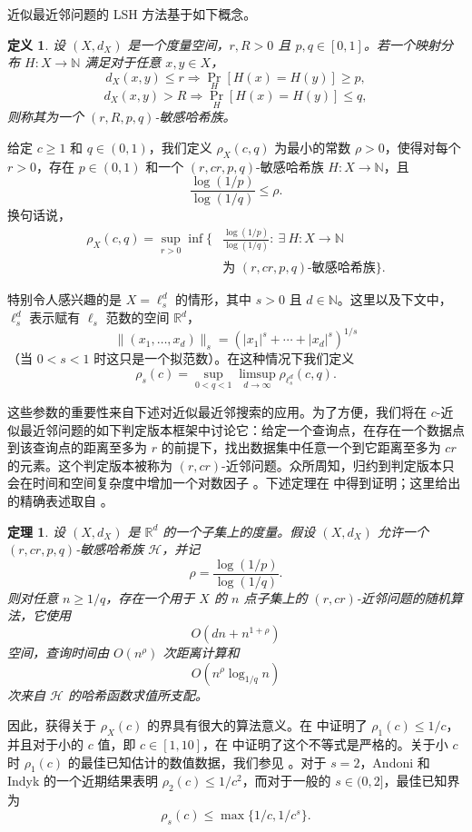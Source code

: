 \documentclass[10pt,twocolumn]{ctexart}
\newtheorem{definition}{定义}
\newtheorem{theorem}{定理}
\begin{document}
近似最近邻问题的 LSH 方法基于如下概念。

\begin{definition}
设 $(X,d_X)$ 是一个度量空间，$r,R>0$ 且 $p,q\in[0,1]$。若一个映射分布 $H:X\to\mathbb{N}$ 满足对于任意 $x,y\in X$，
\[
d_X(x,y)\le r \Rightarrow \Pr_H[H(x)=H(y)]\ge p,
\]
\[
d_X(x,y)>R \Rightarrow \Pr_H[H(x)=H(y)]\le q,
\]
则称其为一个 $(r,R,p,q)$-敏感哈希族。
\end{definition}

给定 $c\ge 1$ 和 $q\in(0,1)$，我们定义 $\rho_X(c,q)$ 为最小的常数 $\rho>0$，使得对每个 $r>0$，存在 $p\in(0,1)$ 和一个 $(r,cr,p,q)$-敏感哈希族 $H:X\to\mathbb{N}$，且
\[
\frac{\log(1/p)}{\log(1/q)}\le \rho.
\]
换句话说，
\begin{equation}
\begin{aligned}
\rho_X(c,q)=\sup_{r>0}\inf\{&
\frac{\log(1/p)}{\log(1/q)}:\ \exists\ H:X\to\mathbb{N}\\
&\text{为 }(r,cr,p,q)\text{-敏感哈希族}\}.
\end{aligned}
\end{equation}

特别令人感兴趣的是 $X=\ell_s^d$ 的情形，其中 $s>0$ 且 $d\in\mathbb{N}$。这里以及下文中，$\ell_s^d$ 表示赋有 $\ell_s$ 范数的空间 $\mathbb{R}^d$，
\[
\|(x_1,\ldots,x_d)\|_s=(|x_1|^s+\cdots+|x_d|^s)^{1/s}
\]
（当 $0<s<1$ 时这只是一个拟范数）。在这种情况下我们定义
\[
\rho_s(c)=\sup_{0<q<1}\limsup_{d\to\infty}\rho_{\ell_s^d}(c,q).
\]

这些参数的重要性来自下述对近似最近邻搜索的应用。为了方便，我们将在 $c$-近似最近邻问题的如下判定版本框架中讨论它：给定一个查询点，在存在一个数据点到该查询点的距离至多为 $r$ 的前提下，找出数据集中任意一个到它距离至多为 $cr$ 的元素。这个判定版本被称为 $(r,cr)$-近邻问题。众所周知，归约到判定版本只会在时间和空间复杂度中增加一个对数因子 \cite{IM98,HP01}。下述定理在 \cite{IM98} 中得到证明；这里给出的精确表述取自 \cite{DIM04}。

\begin{theorem}
设 $(X,d_X)$ 是 $\mathbb{R}^d$ 的一个子集上的度量。假设 $(X,d_X)$ 允许一个 $(r,cr,p,q)$-敏感哈希族 $\mathcal{H}$，并记
\[
\rho=\frac{\log(1/p)}{\log(1/q)}.
\]
则对任意 $n\ge 1/q$，存在一个用于 $X$ 的 $n$ 点子集上的 $(r,cr)$-近邻问题的随机算法，它使用
\[
O(dn+n^{1+\rho})
\]
空间，查询时间由 $O(n^\rho)$ 次距离计算和
\[
O\!\left(n^\rho\log_{1/q}n\right)
\]
次来自 $\mathcal{H}$ 的哈希函数求值所支配。
\end{theorem}

因此，获得关于 $\rho_X(c)$ 的界具有很大的算法意义。在 \cite{IM98} 中证明了 $\rho_1(c)\le 1/c$，并且对于小的 $c$ 值，即 $c\in[1,10]$，在 \cite{DIM04} 中证明了这个不等式是严格的。关于小 $c$ 时 $\rho_1(c)$ 的最佳已知估计的数值数据，我们参见 \cite{DIM04}。对于 $s=2$，Andoni 和 Indyk \cite{AI05} 的一个近期结果表明 $\rho_2(c)\le 1/c^2$，而对于一般的 $s\in(0,2]$，最佳已知界 \cite{DIM04} 为
\[
\rho_s(c)\le \max\{1/c,1/c^s\}.
\]
\end{document}
